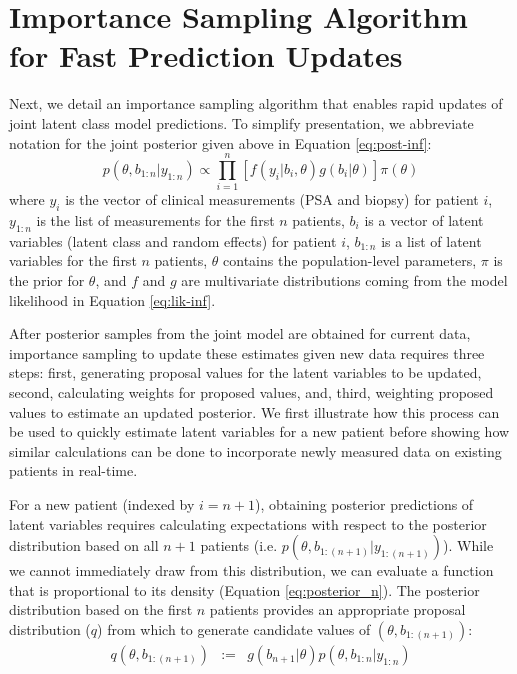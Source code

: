 \documentclass[12pt, letterpaper]{article}
\begin{document}
\section{Importance Sampling Algorithm for Fast Prediction Updates}
Next, we detail an importance sampling algorithm that enables rapid updates of joint latent class model predictions. To simplify presentation, we abbreviate notation for the joint posterior given above in Equation \ref{eq:post-inf}: 
\begin{equation}
p(\theta,b_{1:n}|y_{1:n})\propto\prod_{i=1}^{n}[f(y_{i}|b_{i},\theta)g(b_{i}|\theta)]\pi(\theta)\label{eq:posterior_n}
\end{equation}
where $y_{i}$ is the vector of clinical measurements (PSA and biopsy) for patient $i$, $y_{1:n}$ is the list of measurements for the first $n$ patients, $b_{i}$ is a vector of latent variables (latent class and random effects) for patient $i$, $b_{1:n}$ is a list of latent variables for the first $n$ patients, $\theta$ contains the population-level parameters, $\pi$ is the prior for $\theta$, and $f$ and $g$ are multivariate distributions coming from the model likelihood in Equation \ref{eq:lik-inf}.

After posterior samples from the joint model are obtained for current data, importance sampling to update these estimates given new data requires three steps: first, generating proposal values for the latent variables to be updated, second, calculating weights for proposed values, and, third, weighting proposed values to estimate an updated posterior. We first illustrate how this process can be used to quickly estimate latent variables for a new patient before showing how similar calculations can be done to incorporate newly measured data on existing patients in real-time.

For a new patient (indexed by $i=n+1$), obtaining posterior predictions of latent variables requires calculating expectations with respect to the posterior distribution based on all $n+1$ patients (i.e. $p(\theta,b_{1:(n+1)}|y_{1:(n+1)})$). While we cannot immediately draw from this distribution, we can evaluate a function that is proportional to its density (Equation \ref{eq:posterior_n}). The posterior distribution based on the first $n$ patients provides an appropriate proposal distribution ($q$) from which to generate candidate values of $(\theta,b_{1:(n+1)})$: 
\begin{eqnarray*}
q(\theta,b_{1:(n+1)}) & := & g(b_{n+1}|\theta)p(\theta,b_{1:n}|y_{1:n})
\end{eqnarray*}
\end{document}
